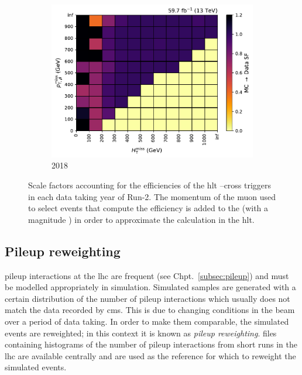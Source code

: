 \begin{figure}[htbp]
    \begin{subfigure}[b]{0.49\textwidth}
        \includegraphics[width=\textwidth]{figures/trigger_efficiencies/2018/SFs.pdf}
        \caption{2018}
    \end{subfigure}
    \caption[Scale factors accounting for the efficiencies of the HLT \ptmiss--\mht cross triggers in each data taking year of Run-2]{Scale factors accounting for the efficiencies of the \acrshort{hlt} \ptmiss--\mht cross triggers in each data taking year of Run-2. The momentum of the muon used to select events that compute the efficiency is added to the \ptvecmiss (with a magnitude \ptmissNoMu) in order to approximate the calculation in the \acrlong{hlt}.}
    \label{fig:htoinv_trig_effs}
\end{figure}




\subsection{Pileup reweighting}
\label{subsec:pu_reweighting}

\Gls{pileup} interactions at the \acrshort{lhc} are frequent (see Chpt.~\ref{subsec:pileup}) and must be modelled appropriately in simulation. Simulated samples are generated with a certain distribution of the number of \gls{pileup} interactions which usually does not match the data recorded by \acrshort{cms}. This is due to changing conditions in the beam over a period of data taking. In order to make them comparable, the simulated events are reweighted; in this context it is known as \emph{\gls{pileup} reweighting}. \ROOT files containing histograms of the number of \gls{pileup} interactions from short runs in the \acrshort{lhc} are available centrally and are used as the reference for which to reweight the simulated events.

